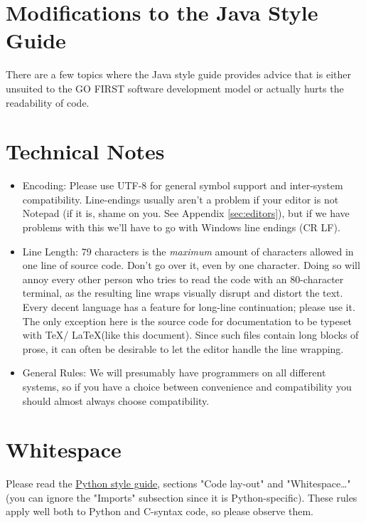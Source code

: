 \documentclass[12pt]{article}
\begin{document}
\section{Modifications to the Java Style Guide}
There are a few topics where the Java style guide provides advice that is either unsuited to the GO FIRST software development model or actually hurts the readability of code.

\section{Technical Notes}
\begin{itemize}
    \item Encoding: Please use UTF-8 for general symbol support and inter-system compatibility. Line-endings usually aren't a problem if your editor is not Notepad (if it is, shame on you. See Appendix \ref{sec:editors}), but if we have problems with this we'll have to go with Windows line endings (CR LF).
    \item Line Length: 79 characters is the \emph{maximum} amount of characters allowed in one line of source code. Don't go over it, even by one character. Doing so will annoy every other person who tries to read the code with an 80-character terminal, as the resulting line wraps visually disrupt and distort the text. Every decent language has a feature for long-line continuation; please use it. \\
        The only exception here is the source code for documentation to be typeset with \TeX / \LaTeX (like this document). Since such files contain long blocks of prose, it can often be desirable to let the editor handle the line wrapping.
    \item General Rules: We will presumably have programmers on all different systems, so if you have a choice between convenience and compatibility you should almost always choose compatibility.

\end{itemize}

\section{Whitespace}
\label{sec:spacing}
Please read the \hyperref[pyguide]{Python style guide}, sections "Code lay-out" and "Whitespace\ldots" (you can ignore the "Imports" subsection since it is Python-specific). These rules apply well both to Python and C-syntax code, so please observe them.
\end{document}
